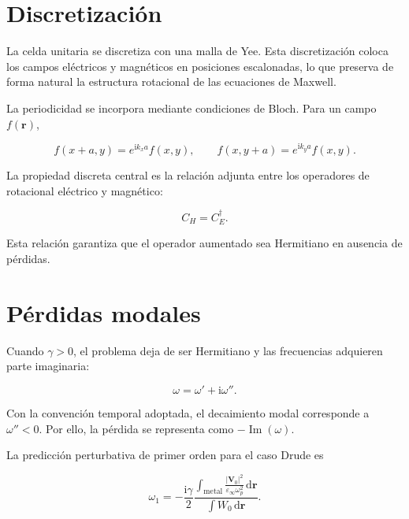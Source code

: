\documentclass[11pt,a4paper]{article}
\newcommand{\ii}{\mathrm{i}}
\newcommand{\dd}{\mathrm{d}}
\newcommand{\epsinf}{\varepsilon_\infty}
\newcommand{\omegap}{\omega_p}
\newcommand{\vect}[1]{\bm{#1}}
\begin{document}
\section{Discretización}

La celda unitaria se discretiza con una malla de Yee. Esta discretización
coloca los campos eléctricos y magnéticos en posiciones escalonadas, lo que
preserva de forma natural la estructura rotacional de las ecuaciones de
Maxwell.

La periodicidad se incorpora mediante condiciones de Bloch. Para un campo
$f(\vect{r})$,

\begin{equation}
  f(x+a,y) = e^{\ii k_x a}f(x,y),
  \qquad
  f(x,y+a) = e^{\ii k_y a}f(x,y).
  \label{eq:bloch}
\end{equation}

La propiedad discreta central es la relación adjunta entre los operadores de
rotacional eléctrico y magnético:

\begin{equation}
  C_H = C_E^\dagger.
  \label{eq:curl_adjoint}
\end{equation}

Esta relación garantiza que el operador aumentado sea Hermitiano en ausencia
de pérdidas.

\section{Pérdidas modales}

Cuando $\gamma > 0$, el problema deja de ser Hermitiano y las frecuencias
adquieren parte imaginaria:

\begin{equation}
  \omega = \omega' + \ii\omega''.
\end{equation}

Con la convención temporal adoptada, el decaimiento modal corresponde a
$\omega''<0$. Por ello, la pérdida se representa como $-\operatorname{Im}
(\omega)$.

La predicción perturbativa de primer orden para el caso Drude es

\begin{equation}
  \omega_1
  =
  -\frac{\ii\gamma}{2}
  \frac{
    \displaystyle
    \int_{\mathrm{metal}}
    \frac{|\vect{V}_0|^2}{\epsinf\omegap^2}
    \,\dd \vect{r}
  }{
    \displaystyle
    \int W_0\,\dd \vect{r}
  }.
  \label{eq:perturbation}
\end{equation}
\end{document}
